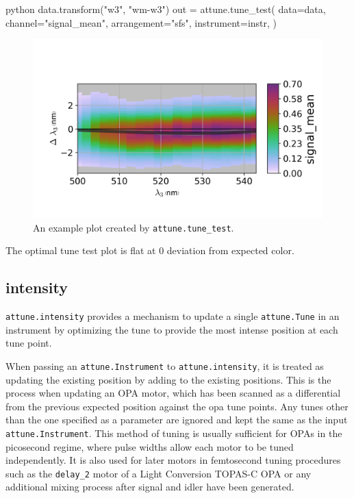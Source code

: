 \begin{codefragment}{python}
data.transform("w3", "wm-w3")
out = attune.tune_test(
    data=data,
    channel="signal_mean",
    arrangement="sfs",
    instrument=instr,
)
\end{codefragment}

\begin{figure}
\includegraphics{representation/images/tune_test.png}
\caption[Tune Test]{
	An example plot created by \texttt{attune.tune\_test}.
}
\label{rep:fig:tune_test}
\end{figure}

The optimal tune test plot is flat at 0 deviation from expected color.

\hypertarget{intensity}{%
\subsection{intensity}\label{intensity}}

\texttt{attune.intensity} provides a mechanism to
update a single \texttt{attune.Tune} in an instrument
by optimizing the tune to provide the most intense position at each tune
point.

When passing an \texttt{attune.Instrument} to
\texttt{attune.intensity}, it is treated as updating
the existing position by adding to the existing positions. This is the
process when updating an OPA motor, which has been scanned as a
differential from the previous expected position against the opa tune
points. Any tunes other than the one specified as a parameter are
ignored and kept the same as the input
\texttt{attune.Instrument}. This method of tuning is
usually sufficient for OPAs in the picosecond regime, where pulse widths
allow each motor to be tuned independently. It is also used for later
motors in femtosecond tuning procedures such as the \texttt{delay\_2}
motor of a Light Conversion TOPAS-C OPA or any additional mixing process
after signal and idler have been generated.

